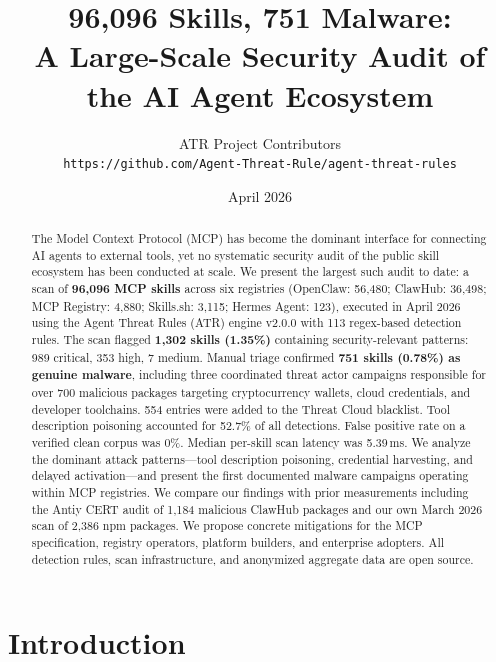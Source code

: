 \documentclass[letterpaper,twocolumn,10pt]{article}
\title{\Large \textbf{96,096 Skills, 751 Malware:\\A Large-Scale Security Audit of the AI Agent Ecosystem}}
\author{
  ATR Project Contributors\\
  \texttt{https://github.com/Agent-Threat-Rule/agent-threat-rules}
}
\date{April 2026}
\begin{document}
\maketitle

\begin{abstract}

The Model Context Protocol (MCP) has become the dominant interface for
connecting AI agents to external tools, yet no systematic security audit
of the public skill ecosystem has been conducted at scale.  We present
the largest such audit to date: a scan of \textbf{96,096 MCP skills}
across six registries (OpenClaw: 56,480; ClawHub: 36,498; MCP Registry:
4,880; Skills.sh: 3,115; Hermes Agent: 123), executed in April 2026
using the Agent Threat Rules (ATR) engine v2.0.0 with 113 regex-based
detection rules.  The scan flagged \textbf{1,302 skills (1.35\%)}
containing security-relevant patterns: 989 critical, 353 high, 7 medium.
Manual triage confirmed \textbf{751 skills (0.78\%) as genuine malware},
including three coordinated threat actor campaigns responsible for over
700 malicious packages targeting cryptocurrency wallets, cloud
credentials, and developer toolchains.  554 entries were added to the
Threat Cloud blacklist.  Tool description poisoning accounted for 52.7\%
of all detections.  False positive rate on a verified clean corpus was
0\%.  Median per-skill scan latency was 5.39\,ms.  We analyze the
dominant attack patterns---tool description poisoning, credential
harvesting, and delayed activation---and present the first documented
malware campaigns operating within MCP registries.  We compare our
findings with prior measurements including the Antiy CERT audit of 1,184
malicious ClawHub packages and our own March 2026 scan of 2,386 npm
packages.  We propose concrete mitigations for the MCP specification,
registry operators, platform builders, and enterprise adopters.  All
detection rules, scan infrastructure, and anonymized aggregate data are
open source.

\end{abstract}

\section{Introduction}
\label{sec:intro}
\end{document}
